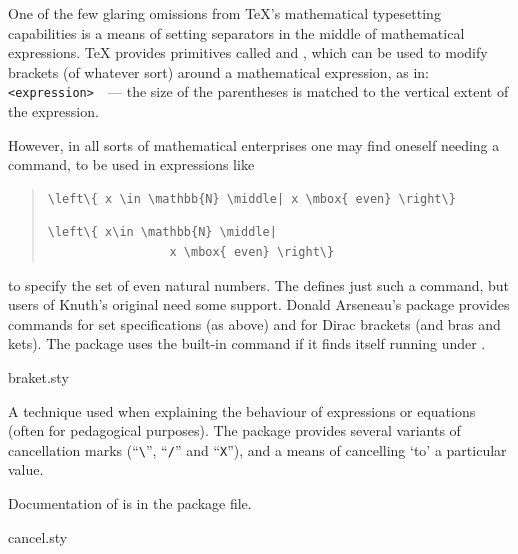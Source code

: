 
One of the few glaring omissions from \TeX{}'s mathematical
typesetting capabilities is a means of setting separators in the
middle of mathematical expressions.  \TeX{} provides primitives called
 and , which can be used to modify brackets (of
whatever sort) around a mathematical expression, as in:
\texttt{ <expression> }~--- the size of the
parentheses is matched to the vertical extent of the expression.

However, in all sorts of mathematical enterprises one may find oneself
needing a  command, to be used in expressions like
\begin{quote}
\begin{wideversion}
\begin{verbatim}
\left\{ x \in \mathbb{N} \middle| x \mbox{ even} \right\}
\end{verbatim}
\end{wideversion}
\begin{narrowversion}
\begin{verbatim}
\left\{ x\in \mathbb{N} \middle| 
                 x \mbox{ even} \right\}
\end{verbatim}
\end{narrowversion}
\end{quote}
to specify the set of even natural numbers.  The %
defines just such a command, but users of Knuth's original need some
support.  Donald Arseneau's  package provides commands
for set specifications (as above) and for Dirac brackets (and bras and
kets).  The package uses the \eTeX{} built-in command if it finds
itself running under \eTeX{}.
\begin{ctanrefs}
\item[braket.sty]
\end{ctanrefs}


A technique used when explaining the behaviour of expressions or
equations (often for pedagogical purposes).  The 
package provides several variants of cancellation marks
(``\texttt{\textbackslash }'', ``\texttt{/}'' and ``\texttt{X}''), and
a means of cancelling `to' a particular value.

Documentation of  is in the package file.
\begin{ctanrefs}
\item[cancel.sty]
\end{ctanrefs}

